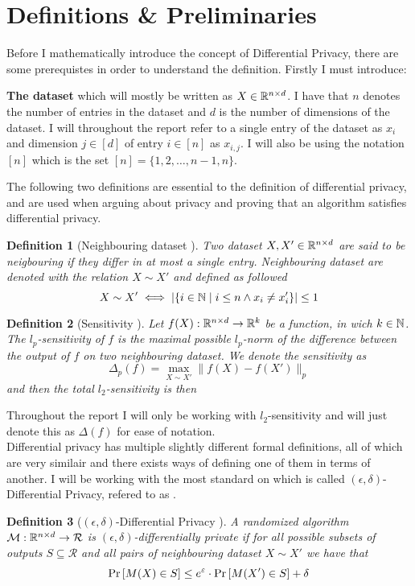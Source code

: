 \documentclass[a4paper,12pt]{article}
\newtheorem{definition}{Definition}[section]
\begin{document}
\section{Definitions \& Preliminaries}
Before I mathematically introduce the concept of Differential Privacy, there are some prerequistes in order to understand the definition.
Firstly I must introduce:

\textbf{The dataset} which will mostly be written as $X \in \mathbb{R}^{n \times d}$.
I have that $n$ denotes the number of entries in the dataset and 
$d$ is the number of dimensions of the dataset.
I will throughout the report refer to a single entry of 
the dataset as $x_i$ and dimension $j \in [d]$ of entry $i \in [n]$ as $x_{i,j}$.
I will also be using the notation $[n]$ which is the set $[n] = \{1,2,\dots,n-1, n\}$.
\vspace*{0.3cm}

\noindent The following two definitions are essential to the definition of differential privacy, and are used
when arguing about privacy and proving that an algorithm satisfies differential privacy.
\begin{definition}[Neighbouring dataset \cite{dpbasic}]
Two dataset $X, X' \in \mathbb{R}^{n \times d}$ are said to be 
neigbouring if they differ in at most a single entry.
Neighbouring dataset are denoted with the relation $X \sim X'$ and defined as followed
\[ X \sim X' \iff \left | \left \{ i \in \mathbb{N} \; \text{\textbar} \; i \le n \land x_i \ne x_i' \right\} \right| \le 1 \]
\end{definition}

\begin{definition}[Sensitivity ] %
\label{def:sensitivity}
Let $f(X): \mathbb{R}^{n \times d} \rightarrow \mathbb{R}^k$ be a function, in wich $k \in \mathbb{N}$.
The $l_p$-sensitivity of $f$ is the maximal 
possible $l_p$-norm of the difference between the output of $f$ 
on two neighbouring dataset.
We denote the sensitivity as 
\[
\Delta_p (f) = \max_{X \sim X'} \| f(X) - f(X') \|_p 
\]
and then the total $l_2$-sensitivity is then
\end{definition}
\noindent Throughout the report I will only be working with $l_2$-sensitivity and
will just denote this as $\Delta(f)$ for ease of notation. \\

Differential privacy has multiple slightly different
formal definitions, all of which are very similair and there exists ways of
defining one of them in terms of another.
I will be working with the most standard on which is called $(\epsilon, \delta)$-Differential Privacy,
refered to as \edp.
\vspace*{0.3cm}
\begin{definition}[$(\epsilon, \delta)$-Differential Privacy ]

A randomized algorithm $\mathcal{M}: \mathbb{R}^{n \times d} \rightarrow \mathcal{R}$ 
is $(\epsilon, \delta)$-differentially private if for all possible 
subsets of outputs $S \subseteq \mathcal{R}$ and all pairs of 
neighbouring dataset $X \sim X'$ we have that
\[ \Pr\left [M(X) \in S \right] \le e^{\varepsilon} \cdot \Pr\left [M(X') \in S \right] + \delta \]

\end{definition}
\end{document}
